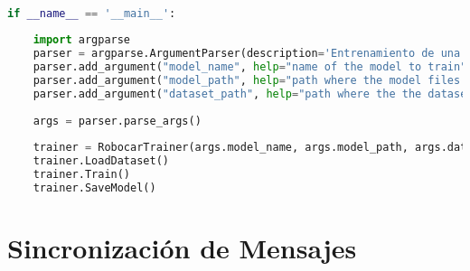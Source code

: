 \begin{lstlisting}[title={train\_model.py},language=Python]
    
    
    
if __name__ == '__main__':
        
    import argparse
    parser = argparse.ArgumentParser(description='Entrenamiento de una red neuronal convolucional')
    parser.add_argument("model_name", help="name of the model to train")
    parser.add_argument("model_path", help="path where the model files will be saved")
    parser.add_argument("dataset_path", help="path where the the dataset is saved")
        
    args = parser.parse_args()
        
    trainer = RobocarTrainer(args.model_name, args.model_path, args.dataset_path)
    trainer.LoadDataset()
    trainer.Train()
    trainer.SaveModel()

\end{lstlisting}

\section{Sincronización de Mensajes}

